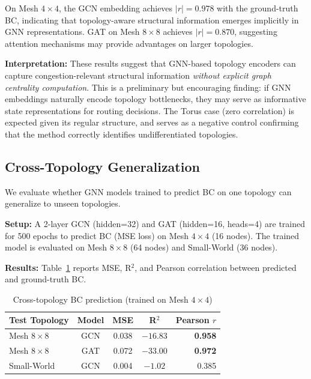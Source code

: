 \documentclass[conference]{IEEEtran}
\begin{document}
On Mesh $4\times4$, the GCN embedding achieves $|r| = 0.978$ with the ground-truth BC, indicating that topology-aware structural information emerges implicitly in GNN representations. GAT on Mesh $8\times8$ achieves $|r| = 0.870$, suggesting attention mechanisms may provide advantages on larger topologies.

\textbf{Interpretation:} These results suggest that GNN-based topology encoders can capture congestion-relevant structural information \emph{without explicit graph centrality computation}. This is a preliminary but encouraging finding: if GNN embeddings naturally encode topology bottlenecks, they may serve as informative state representations for routing decisions. The Torus case (zero correlation) is expected given its regular structure, and serves as a negative control confirming that the method correctly identifies undifferentiated topologies.

\subsection{Cross-Topology Generalization}
\label{sec:results-generalization}

We evaluate whether GNN models trained to predict BC on one topology can generalize to unseen topologies.

\textbf{Setup:} A 2-layer GCN (hidden=32) and GAT (hidden=16, heads=4) are trained for 500 epochs to predict BC (MSE loss) on Mesh $4\times4$ (16 nodes). The trained model is evaluated on Mesh $8\times8$ (64 nodes) and Small-World (36 nodes).

\textbf{Results:} Table~\ref{tab:generalization} reports MSE, R$^2$, and Pearson correlation between predicted and ground-truth BC.

\begin{table}[h]
\centering
\caption{Cross-topology BC prediction (trained on Mesh $4\times4$)}
\label{tab:generalization}
\small
\begin{tabular}{lcccr}
\toprule
\textbf{Test Topology} & \textbf{Model} & \textbf{MSE} & \textbf{R$^2$} & \textbf{Pearson $r$} \\
\midrule
Mesh $8\times8$ & GCN & 0.038 & $-16.83$ & \textbf{0.958} \\
Mesh $8\times8$ & GAT & 0.072 & $-33.00$ & \textbf{0.972} \\
Small-World & GCN & 0.004 & $-1.02$ & 0.385 \\
\bottomrule
\end{tabular}
\end{table}
\end{document}
